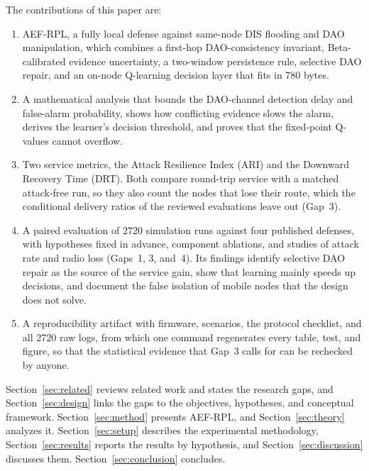 The contributions of this paper are:
\begin{enumerate}
\item AEF-RPL, a fully local defense against same-node DIS flooding and DAO manipulation, which combines a first-hop DAO-consistency invariant, Beta-calibrated evidence uncertainty, a two-window persistence rule, selective DAO repair, and an on-node Q-learning decision layer that fits in 780 bytes.
\item A mathematical analysis that bounds the DAO-channel detection delay and false-alarm probability, shows how conflicting evidence slows the alarm, derives the learner's decision threshold, and proves that the fixed-point Q-values cannot overflow.
\item Two service metrics, the Attack Resilience Index (ARI) and the Downward Recovery Time (DRT). Both compare round-trip service with a matched attack-free run, so they also count the nodes that lose their route, which the conditional delivery ratios of the reviewed evaluations leave out (Gap~3).
\item A paired evaluation of 2720 simulation runs against four published defenses, with hypotheses fixed in advance, component ablations, and studies of attack rate and radio loss (Gaps~1, 3, and~4). Its findings identify selective DAO repair as the source of the service gain, show that learning mainly speeds up decisions, and document the false isolation of mobile nodes that the design does not solve.
\item A reproducibility artifact with firmware, scenarios, the protocol checklist, and all 2720 raw logs, from which one command regenerates every table, test, and figure, so that the statistical evidence that Gap~3 calls for can be rechecked by anyone.
\end{enumerate}

Section~\ref{sec:related} reviews related work and states the research gaps, and Section~\ref{sec:design} links the gaps to the objectives, hypotheses, and conceptual framework. Section~\ref{sec:method} presents AEF-RPL, and Section~\ref{sec:theory} analyzes it. Section~\ref{sec:setup} describes the experimental methodology, Section~\ref{sec:results} reports the results by hypothesis, and Section~\ref{sec:discussion} discusses them. Section~\ref{sec:conclusion} concludes.
